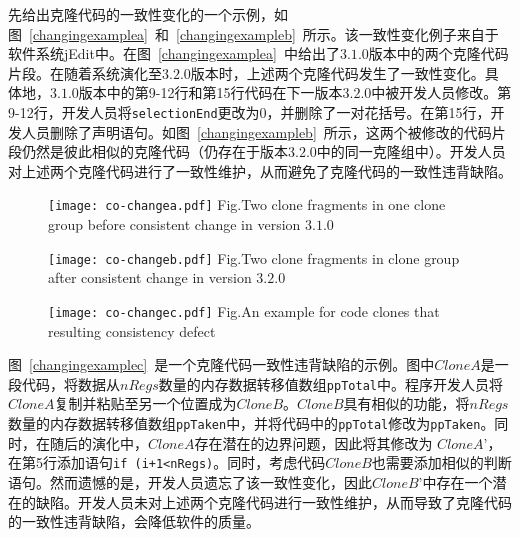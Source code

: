 先给出克隆代码的一致性变化的一个示例，如图~\ref{changingexamplea}~和~\ref{changingexampleb}~所示。该一致性变化例子来自于软件系统jEdit中。在图~\ref{changingexamplea}~中给出了$ 3.1.0 $版本中的两个克隆代码片段。在随着系统演化至$ 3.2.0 $版本时，上述两个克隆代码发生了一致性变化。具体地，$ 3.1.0 $版本中的第9-12行和第15行代码在下一版本$ 3.2.0 $中被开发人员修改。第9-12行，开发人员将{\tt selectionEnd}更改为$ 0 $，并删除了一对花括号。在第15行，开发人员删除了声明语句。如图~\ref{changingexampleb}~所示，这两个被修改的代码片段仍然是彼此相似的克隆代码（仍存在于版本$ 3.2.0 $中的同一克隆组中）。开发人员对上述两个克隆代码进行了一致性维护，从而避免了克隆代码的一致性违背缺陷。

\begin{figure}[htbp]
\centering
\texttt{[image: co-changea.pdf]}
{Fig.$\!$}{Two clone fragments in one clone group before consistent change in version $3.1.0$}
\vspace{-1em}
\end{figure}

\begin{figure}[htbp]
\centering
\texttt{[image: co-changeb.pdf]}
{Fig.$\!$}{Two clone fragments in clone group after consistent change in version $3.2.0$}
\vspace{-1em}
\end{figure}

\begin{figure}[htbp]
\centering
\texttt{[image: co-changec.pdf]}
{Fig.$\!$}{An example for code clones that resulting consistency defect\cite{nguyen2012clone}}
\vspace{-1em}
\end{figure}

图~\ref{changingexamplec}~是一个克隆代码一致性违背缺陷的示例。图中$Clone A$是一段代码，将数据从$nRegs$数量的内存数据转移值数组{\tt ppTotal}中。程序开发人员将$Clone A$复制并粘贴至另一个位置成为$Clone B$。$Clone B$具有相似的功能，将$nRegs$数量的内存数据转移值数组{\tt ppTaken}中，并将代码中的{\tt ppTotal}修改为{\tt ppTaken}。同时，在随后的演化中，$Clone A$存在潜在的边界问题，因此将其修改为 $Clone A’$，在第5行添加语句{\tt if (i+1<nRegs)}。同时，考虑代码$Clone B$也需要添加相似的判断语句。然而遗憾的是，开发人员遗忘了该一致性变化，因此$Clone B’$中存在一个潜在的缺陷。开发人员未对上述两个克隆代码进行一致性维护，从而导致了克隆代码的一致性违背缺陷，会降低软件的质量。

